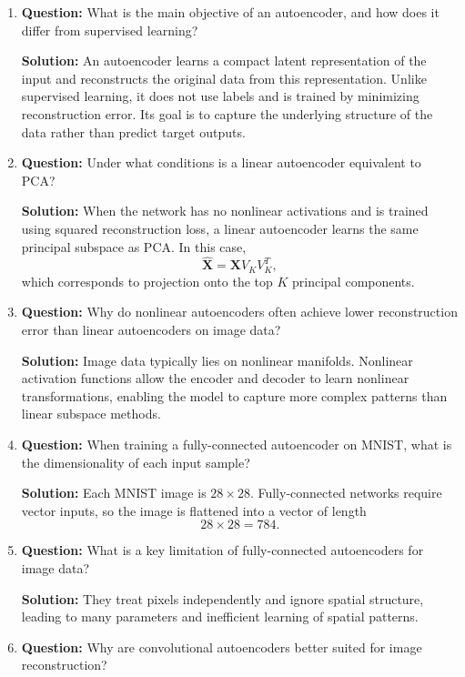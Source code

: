 \documentclass{article}
\begin{document}
\begin{enumerate}

\item \textbf{Question:}  
What is the main objective of an autoencoder, and how does it differ from supervised learning?

\textbf{Solution:}  
An autoencoder learns a compact latent representation of the input and reconstructs the original data from this representation. Unlike supervised learning, it does not use labels and is trained by minimizing reconstruction error. Its goal is to capture the underlying structure of the data rather than predict target outputs.

\item \textbf{Question:}  
Under what conditions is a linear autoencoder equivalent to PCA?

\textbf{Solution:}  
When the network has no nonlinear activations and is trained using squared reconstruction loss, a linear autoencoder learns the same principal subspace as PCA. In this case,
\[
\hat{\mathbf{X}}=\mathbf{X}V_KV_K^T,
\]
which corresponds to projection onto the top \(K\) principal components.

\item \textbf{Question:}  
Why do nonlinear autoencoders often achieve lower reconstruction error than linear autoencoders on image data?

\textbf{Solution:}  
Image data typically lies on nonlinear manifolds. Nonlinear activation functions allow the encoder and decoder to learn nonlinear transformations, enabling the model to capture more complex patterns than linear subspace methods.

\item \textbf{Question:}  
When training a fully-connected autoencoder on MNIST, what is the dimensionality of each input sample?

\textbf{Solution:}  
Each MNIST image is \(28\times28\). Fully-connected networks require vector inputs, so the image is flattened into a vector of length
\[
28\times28=784.
\]

\item \textbf{Question:}  
What is a key limitation of fully-connected autoencoders for image data?

\textbf{Solution:}  
They treat pixels independently and ignore spatial structure, leading to many parameters and inefficient learning of spatial patterns.

\item \textbf{Question:}  
Why are convolutional autoencoders better suited for image reconstruction?


\end{enumerate}
\end{document}
